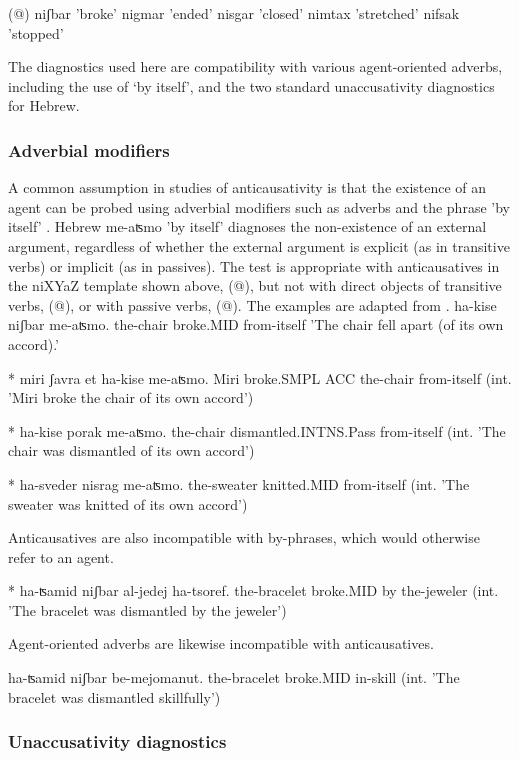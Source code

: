 (@) niʃbar   'broke'
    nigmar   'ended'
    nisgar   'closed'
    nimtax   'stretched'
    nifsak  'stopped'

The diagnostics used here are compatibility with various agent-oriented adverbs, including the use of ‘by itself’, and the two standard unaccusativity diagnostics for Hebrew.

		\subsubsection{Adverbial modifiers}
A common assumption in studies of anticausativity is that the existence of an agent can be probed using adverbial modifiers such as adverbs and the phrase 'by itself' \citep{unaccusativity95,alexiadouanagnostopoulou04,koontzgarboden09,alexiadoudoron12,kastner17gjgl}. Hebrew me-aʦmo 'by itself' diagnoses the non-existence of an external argument, regardless of whether the external argument is explicit (as in transitive verbs) or implicit (as in passives). The test is appropriate with anticausatives in the niXYaZ template shown above, (@), but not with direct objects of transitive verbs, (@), or with passive verbs, (@). The examples are adapted from \cite{kastner17gjgl}.
    ha-kise niʃbar me-aʦmo.
       the-chair broke.MID from-itself
       'The chair fell apart (of its own accord).'
    
* miri ʃavra et ha-kise me-aʦmo.
       Miri broke.SMPL ACC the-chair from-itself
         (int. 'Miri broke the chair of its own accord')
     
         * ha-kise porak me-aʦmo.
         the-chair dismantled.INTNS.Pass from-itself
         (int. 'The chair was dismantled of its own accord')
    
         * ha-sveder nisrag me-aʦmo.
         the-sweater knitted.MID from-itself
         (int. 'The sweater was knitted of its own accord')
    
Anticausatives are also incompatible with by-phrases, which would otherwise refer to an agent.

     * ha-ʦamid niʃbar al-jedej ha-tsoref.
     the-bracelet broke.MID by the-jeweler
     (int. 'The bracelet was dismantled by the jeweler')

Agent-oriented adverbs are likewise incompatible with anticausatives.

     ha-ʦamid niʃbar be-mejomanut.
     the-bracelet broke.MID in-skill
     (int. 'The bracelet was dismantled skillfully')
 
		\subsubsection{Unaccusativity diagnostics}

